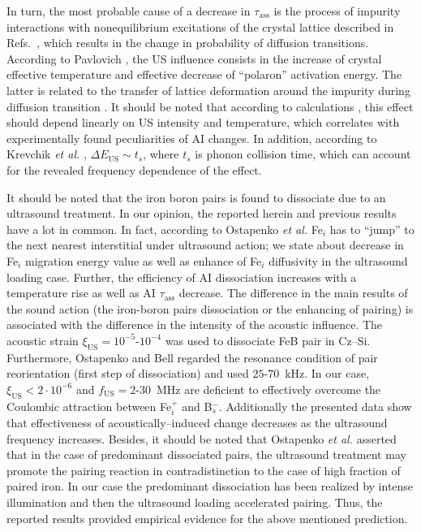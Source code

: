 \documentclass[%
 aip,jap,
 amsmath,amssymb,
 reprint,%
]{revtex4-1}
\begin{document}
In turn, the most probable cause of a decrease in $\tau_\mathrm{ass}$ is the process of impurity interactions with nonequilibrium excitations of the crystal lattice described in
Refs.~,
which results in the change in probability of diffusion transitions.
According to Pavlovich \cite{Pavlovich}, the US influence consists in the increase of crystal effective temperature and effective decrease of ``polaron'' activation energy.
The latter is related to the transfer of lattice deformation around the impurity during diffusion transition \cite{Pavlovich}.
It should be noted that according to calculations \cite{Pavlovich}, this effect should depend linearly on US intensity and temperature,
which correlates with experimentally found peculiarities of AI changes.
In addition, according to Krevchik \emph{et al.} \cite{Krevchik},
$\Delta E_\mathrm{US}\sim t_s$,
where $t_s$ is phonon collision time, which can account for the revealed frequency dependence of the effect.


It should be noted that the iron boron pairs is found\cite{Ostapenko1995,Ostapenko1994APL,Ostapenko1995SST}
to dissociate due to an ultrasound treatment.
In our opinion,
the reported herein and previous results have a lot in common.
In fact, according to Ostapenko \emph{et al.}\cite{Ostapenko1995SST}
Fe$_i$ has to ``jump'' to the next nearest interstitial under ultrasound action;
we state about decrease in Fe$_i$ migration energy value
as well as enhance of Fe$_i$ diffusivity
in the ultrasound loading case.
Further, the efficiency of AI dissociation increases with a temperature rise as well as AI $\tau_\mathrm{ass}$ decrease.
The difference in the main results of the sound action
(the iron-boron pairs dissociation or the enhancing of pairing)
is associated with the difference in the intensity of the acoustic influence.
The acoustic strain $\xi_\mathrm{US}=10^{-5}$-$10^{-4}$ was used\cite{Ostapenko1995} to
dissociate FeB pair in Cz--Si.
Furthermore,
Ostapenko and Bell\cite{Ostapenko1995} regarded the resonance condition of
pair reorientation (first step of dissociation) and used $25$-$70$~kHz.
In our case,  $\xi_\mathrm{US}<2\cdot10^{-6}$ and $f_\mathrm{US}=2$-$30$~MHz are deficient to effectively overcome the Coulombic attraction between Fe$_i^+$ and B$_s^-$.
Additionally the presented data show that effectiveness of acoustically--induced change
decreases as the ultrasound frequency increases.
Besides, it should be noted that Ostapenko \emph{et al.}\cite{Ostapenko1994APL} asserted
that in the  case  of predominant  dissociated  pairs,  the ultrasound treatment may promote  the
pairing reaction in contradistinction to the case of high fraction of paired iron.
In our case the predominant  dissociation has been realized by intense illumination and then
the ultrasound loading accelerated pairing.
Thus, the reported results provided empirical evidence  for the above mentioned prediction.
\end{document}
